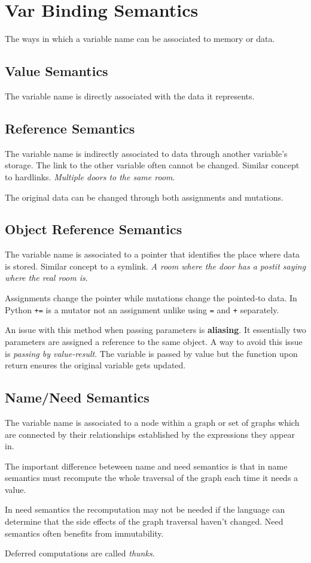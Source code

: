 \section{Var Binding Semantics}
The ways in which a variable name can be associated to memory or data.

\subsection*{Value Semantics}
The variable name is directly associated with the data it represents.

\subsection*{Reference Semantics}
The variable name is indirectly associated to data through another
variable's storage. The link to the other variable often cannot be
changed. Similar concept to hardlinks. \textit{Multiple doors to the
same room}.

The original data can be changed through both assignments and mutations.

\subsection*{Object Reference Semantics}
The variable name is associated to a pointer that identifies the place
where data is stored. Similar concept to a symlink. \textit{A room where
the door has a postit saying where the real room is}.

Assignments change the pointer while mutations change the pointed-to
data. In Python \lstinline|+=| is a mutator not an assignment unlike
using \lstinline|=| and \lstinline|+| separately.

An issue with this method when passing parameters is \textbf{aliasing}.
It essentially two parameters are assigned a reference to the same
object. A way to avoid this issue is \textit{passing by value-result}.
The variable is passed by value but the function upon return ensures the
original variable gets updated.

\subsection*{Name/Need Semantics}
The variable name is associated to a node within a graph or set of
graphs which are connected by their relationships established by the
expressions they appear in.

The important difference beteween name and need semantics is that in
name semantics must recompute the whole traversal of the graph each time
it needs a value.

In need semantics the recomputation may not be needed if the language
can determine that the side effects of the graph traversal haven't
changed. Need semantics often benefits from immutability.

Deferred computations are called \textit{thunks}.
